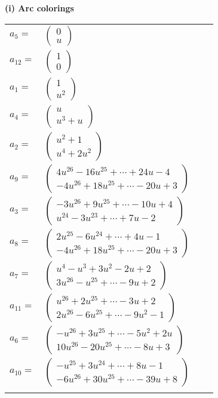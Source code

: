 \documentclass[1p]{elsarticle_modified}
\theoremstyle{definition}
\begin{document}
\flushleft \textbf{(i) Arc colorings}\\
\begin{tabular}{m{7pt} m{180pt} m{7pt} m{180pt} }
\flushright $a_{5}=$&$\begin{pmatrix}0\\u\end{pmatrix}$ \\
\flushright $a_{12}=$&$\begin{pmatrix}1\\0\end{pmatrix}$ \\
\flushright $a_{1}=$&$\begin{pmatrix}1\\u^2\end{pmatrix}$ \\
\flushright $a_{4}=$&$\begin{pmatrix}u\\u^3+u\end{pmatrix}$ \\
\flushright $a_{2}=$&$\begin{pmatrix}u^2+1\\u^4+2 u^2\end{pmatrix}$ \\
\flushright $a_{9}=$&$\begin{pmatrix}4 u^{26}-16 u^{25}+\cdots+24 u-4\\-4 u^{26}+18 u^{25}+\cdots-20 u+3\end{pmatrix}$ \\
\flushright $a_{3}=$&$\begin{pmatrix}-3 u^{26}+9 u^{25}+\cdots-10 u+4\\u^{24}-3 u^{23}+\cdots+7 u-2\end{pmatrix}$ \\
\flushright $a_{8}=$&$\begin{pmatrix}2 u^{25}-6 u^{24}+\cdots+4 u-1\\-4 u^{26}+18 u^{25}+\cdots-20 u+3\end{pmatrix}$ \\
\flushright $a_{7}=$&$\begin{pmatrix}u^4- u^3+3 u^2-2 u+2\\3 u^{26}- u^{25}+\cdots-9 u+2\end{pmatrix}$ \\
\flushright $a_{11}=$&$\begin{pmatrix}u^{26}+2 u^{25}+\cdots-3 u+2\\2 u^{26}-6 u^{25}+\cdots-9 u^2-1\end{pmatrix}$ \\
\flushright $a_{6}=$&$\begin{pmatrix}- u^{26}+3 u^{25}+\cdots-5 u^2+2 u\\10 u^{26}-20 u^{25}+\cdots-8 u+3\end{pmatrix}$ \\
\flushright $a_{10}=$&$\begin{pmatrix}- u^{25}+3 u^{24}+\cdots+8 u-1\\-6 u^{26}+30 u^{25}+\cdots-39 u+8\end{pmatrix}$\\&\end{tabular}
\end{document}
